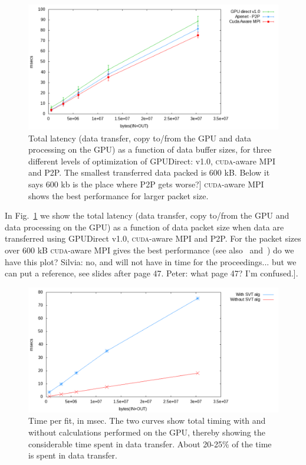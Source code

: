\documentclass[a4]{jpconf}
\providecommand{\fixme}[1]{\xspace{\sffamily{[\bfseries{}FIXME:} #1]}}
\begin{document}
\begin{figure}[tbp]
  \centering
  \includegraphics[width=0.9\linewidth]{figures/datatransfer}
  \caption{Total latency (data transfer, copy to/from the GPU and data
    processing on the GPU) as a function of data buffer sizes, for
    three different levels of optimization of GPUDirect: v1.0,
    \textsc{cuda}-aware MPI and P2P. The smallest transferred data
    packed is 600 kB. \fixme{Below it says 600 kb is the place where
      P2P gets worse?} \textsc{cuda}-aware MPI shows the best
    performance for larger packet size.}
  \label{fig:xferlatency}
\end{figure}

In Fig.~\ref{fig:xferlatency} we show the total latency (data
transfer, copy to/from the GPU and data processing on the GPU) as a
function of data packet size when data are transferred using GPUDirect
v1.0, \textsc{cuda}-aware MPI and P2P. For the packet sizes over 600
kB \textsc{cuda}-aware MPI gives the best performance (see
also~\cite{NSS2012} and~\cite{bib_mvapich})  \fixme{do we have this
  plot? Silvia: no, and will not have in time for the
  proceedings... but we can put a reference, see slides after page
  47. Peter: what page 47? I'm confused.}.


\begin{figure}[tbp]
  \centering
  \includegraphics[width=0.9\linewidth]{figures/cudaware}
  \caption{Time per fit, in msec. The two curves show total timing
    with and without calculations performed on the GPU, thereby
    showing the considerable time spent in data transfer. About
    20-25\% of the time is spent in data transfer.}
  \label{fig:transferOnly}
\end{figure}
\end{document}
